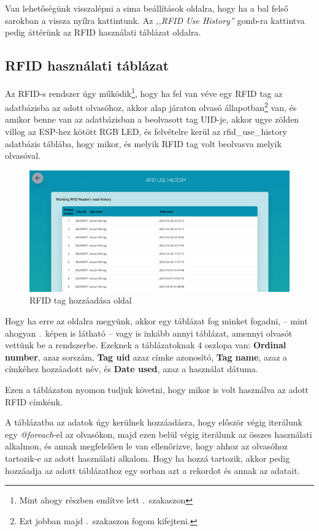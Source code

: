 \documentclass[
]{thesis-ekf}
\theoremstyle{definition}
\theoremstyle{remark}
\begin{document}
	Van lehetőségünk visszalépni a sima beállítások oldalra, hogy ha a bal felső sarokban a vissza nyílra kattintunk. Az \emph{,,RFID Use History''} gomb-ra kattintva pedig áttérünk az RFID használati táblázat oldalra.
	
	\subsection{RFID használati táblázat}
	Az RFID-s rendszer úgy működik\footnote{Mint ahogy részben említve lett .~szakaszon}, hogy ha fel van véve egy RFID tag az adatbázisba az adott olvasóhoz, akkor alap járaton olvasó állapotban\footnote{Ezt jobban majd .~szakaszon fogom kifejteni.} van, és amikor benne van az adatbázisban a beolvasott tag UID-je, akkor ugye zölden villog az ESP-hez kötött RGB LED, és felvételre kerül az rfid\_use\_history adatbázis táblába, hogy mikor, és melyik RFID tag volt beolvasva melyik olvasóval.

	\begin{figure}[ht!]
		\centering
		\includegraphics[width=1\textwidth]{./src/pages_img/rfid-use-history}
		\caption{RFID tag hozzáadása oldal}
		\label{rfid-use-history}
	\end{figure}
	
	Hogy ha erre az oldalra megyünk, akkor egy táblázat fog minket fogadni, -- mint ahogyan .~képen is látható -- vagy is inkább annyi táblázat, amennyi olvasót vettünk be a rendszerbe. Ezeknek a táblázatoknak 4 oszlopa van: \textbf{Ordinal number}, azaz sorszám, \textbf{Tag uid} azaz címke azonosító, \textbf{Tag name}, azaz a címkéhez hozzáadott név, és \textbf{Date used}, azaz a használat dátuma.
	
	Ezen a táblázaton nyomon tudjuk követni, hogy mikor is volt használva az adott RFID címkénk.
	
	A táblázatba az adatok úgy kerülnek hozzáadásra, hogy először végig iterálunk egy \emph{@foreach}-el az olvasókon, majd ezen belül végig iterálunk az összes használati alkalmon, és annak megfelelően le van ellenőrizve, hogy ahhoz az olvasóhoz tartozik-e az adott használati alkalom. Hogy ha hozzá tartozik, akkor pedig hozzáadja az adott táblázathoz egy sorban azt a rekordot és annak az adatait.
	
\end{document}
